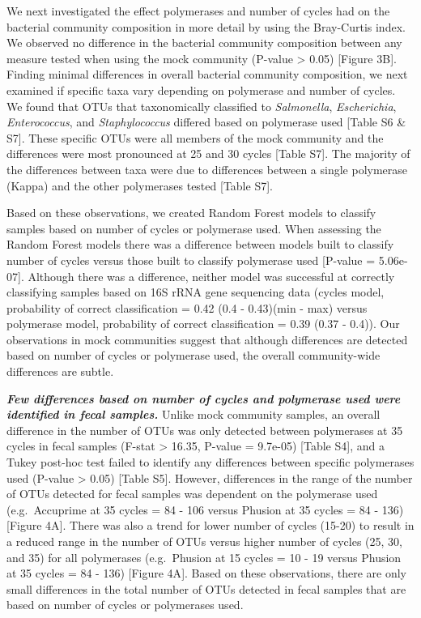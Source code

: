 \documentclass[11pt,]{article}
\begin{document}
We next investigated the effect polymerases and number of cycles had on
the bacterial community composition in more detail by using the
Bray-Curtis index. We observed no difference in the bacterial community
composition between any measure tested when using the mock community
(P-value \textgreater{} 0.05) {[}Figure 3B{]}. Finding minimal
differences in overall bacterial community composition, we next examined
if specific taxa vary depending on polymerase and number of cycles. We
found that OTUs that taxonomically classified to \emph{Salmonella},
\emph{Escherichia}, \emph{Enterococcus}, and \emph{Staphylococcus}
differed based on polymerase used {[}Table S6 \& S7{]}. These specific
OTUs were all members of the mock community and the differences were
most pronounced at 25 and 30 cycles {[}Table S7{]}. The majority of the
differences between taxa were due to differences between a single
polymerase (Kappa) and the other polymerases tested {[}Table S7{]}.

Based on these observations, we created Random Forest models to classify
samples based on number of cycles or polymerase used. When assessing the
Random Forest models there was a difference between models built to
classify number of cycles versus those built to classify polymerase used
{[}P-value = 5.06e-07{]}. Although there was a difference, neither model
was successful at correctly classifying samples based on 16S rRNA gene
sequencing data (cycles model, probability of correct classification =
0.42 (0.4 - 0.43)(min - max) versus polymerase model, probability of
correct classification = 0.39 (0.37 - 0.4)). Our observations in mock
communities suggest that although differences are detected based on
number of cycles or polymerase used, the overall community-wide
differences are subtle.

\textbf{\emph{Few differences based on number of cycles and polymerase
used were identified in fecal samples.}} Unlike mock community samples,
an overall difference in the number of OTUs was only detected between
polymerases at 35 cycles in fecal samples (F-stat \textgreater{} 16.35,
P-value = 9.7e-05) {[}Table S4{]}, and a Tukey post-hoc test failed to
identify any differences between specific polymerases used (P-value
\textgreater{} 0.05) {[}Table S5{]}. However, differences in the range
of the number of OTUs detected for fecal samples was dependent on the
polymerase used (e.g.~Accuprime at 35 cycles = 84 - 106 versus Phusion
at 35 cycles = 84 - 136) {[}Figure 4A{]}. There was also a trend for
lower number of cycles (15-20) to result in a reduced range in the
number of OTUs versus higher number of cycles (25, 30, and 35) for all
polymerases (e.g.~Phusion at 15 cycles = 10 - 19 versus Phusion at 35
cycles = 84 - 136) {[}Figure 4A{]}. Based on these observations, there
are only small differences in the total number of OTUs detected in fecal
samples that are based on number of cycles or polymerases used.
\end{document}
